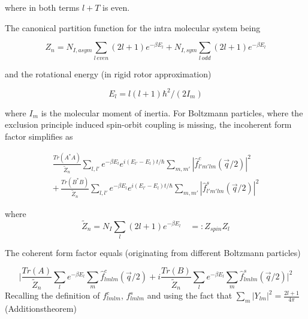\documentclass[11pt,a4paper]{article}
\begin{document}
where in both terms $l + T$ is even. 


The canonical partition function for the intra molecular system being

\begin{equation}
Z_n = N_{I,asym} \sum_{l \,even} (2l + 1) e^{-\beta E_l} +  N_{I,sym} \sum_{l \,odd} (2l + 1) e^{-\beta E_l} 
\end{equation}

and the rotational energy (in rigid rotor approximation)

\begin{equation}
E_l = l(l+1)\hbar^2/(2I_m)
\end{equation}

where $I_m$ is the molecular moment of inertia. \newline For Boltzmann particles, where the exclusion principle induced
spin-orbit coupling is missing, the incoherent form factor simplifies as


\begin{equation}
\begin{split}
\frac{Tr(A^*A)}{\tilde Z_n} \sum_{l,l'} e^{-\beta E_l} e^{i (E_{l'} - E_{l})  t /\hbar }
\sum_{m,m'} |\hat f_{l'm'lm}^c (\vec q /2)|^2
\\ + \,
\frac{Tr(B^*B)}{\tilde Z_n} \sum_{l,l'} e^{-\beta E_l} e^{i  (E_{l'} - E_{l}) t /\hbar }
\sum_{m, m'} |\hat f_{l'm'lm}^s (\vec q /2)|^2
\end{split}
\end{equation}

where
\begin{equation}
\tilde Z_n = N_{I} \sum_{l} (2l + 1) e^{-\beta E_l} \quad
=: Z_{spin} Z_l
\end{equation}

The coherent form factor equals (originating from different Boltzmann particles)

\begin{equation}
\biggr\rvert
\frac{ Tr(A)} {\tilde Z_n} \sum_{l} e^{-\beta E_l} \sum_{m} \hat f_{lmlm}^c (\vec q /2) 
+  i
\frac{ Tr(B)}{\tilde Z_n} \sum_{l} e^{-\beta E_l} \sum_{m} \hat f_{lmlm}^s (\vec q /2)
\biggl\lvert ^2
\end{equation}
Recalling the definition of $f_{lmlm}^c$, $f_{lmlm}^s$  and using the fact that $\sum_m |Y_{lm}|^2 = \frac{2l +1}{4 \pi}$
(Additionstheorem)
\end{document}
